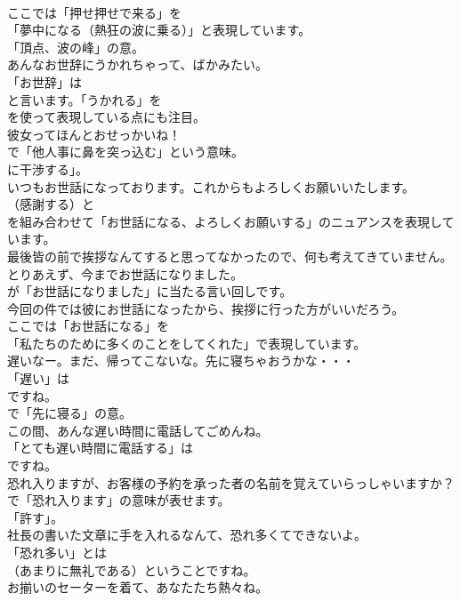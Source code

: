\documentclass[8pt]{extreport}
\begin{document}
\begin{CJK}{UTF8}{min}
\\	ここでは「押せ押せで来る」を
\\	「夢中になる（熱狂の波に乗る）」と表現しています。
\\	「頂点、波の峰」の意。	
\\	あんなお世辞にうかれちゃって、ばかみたい。 
\\	「お世辞」は
\\	と言います。「うかれる」を
\\	を使って表現している点にも注目。	
\\	彼女ってほんとおせっかいね！ 
\\	で「他人事に鼻を突っ込む」という意味。
\\	に干渉する」。	
\\	いつもお世話になっております。これからもよろしくお願いいたします。 
\\	（感謝する）と 
\\	を組み合わせて「お世話になる、よろしくお願いする」のニュアンスを表現しています。	
\\	最後皆の前で挨拶なんてすると思ってなかったので、何も考えてきていません。とりあえず、今までお世話になりました。 
\\	が「お世話になりました」に当たる言い回しです。	
\\	今回の件では彼にお世話になったから、挨拶に行った方がいいだろう。 
\\	ここでは「お世話になる」を
\\	「私たちのために多くのことをしてくれた」で表現しています。	
\\	遅いなー。まだ、帰ってこないな。先に寝ちゃおうかな・・・ 
\\	「遅い」は
\\	ですね。
\\	で「先に寝る」の意。	
\\	この間、あんな遅い時間に電話してごめんね。 
\\	「とても遅い時間に電話する」は
\\	ですね。	
\\	恐れ入りますが、お客様の予約を承った者の名前を覚えていらっしゃいますか？ 
\\	で「恐れ入ります」の意味が表せます。
\\	「許す」。	
\\	社長の書いた文章に手を入れるなんて、恐れ多くてできないよ。 
\\	「恐れ多い」とは
\\	（あまりに無礼である）ということですね。	
\\	お揃いのセーターを着て、あなたたち熱々ね。 

\end{CJK}
\end{document}
